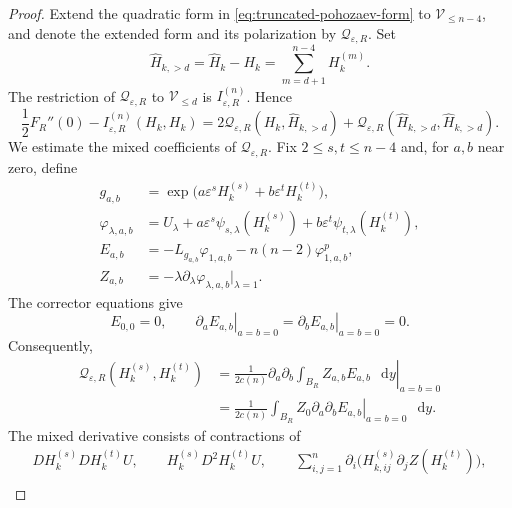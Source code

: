\documentclass[11pt]{article}
\numberwithin{equation}{section}
\theoremstyle{remark}
\newcommand{\dd}{\mathop{}\!\mathrm{d}}
\begin{document}
\begin{proof}
Extend the quadratic form in
\eqref{eq:truncated-pohozaev-form} to $\mathcal V_{\le n-4}$, and denote
the extended form and its polarization by
$\mathcal Q_{\varepsilon,R}$.
Set
{
\begin{equation*}
 \widehat H_{k,>d}
 =\widehat H_k-H_k
 =\sum_{m=d+1}^{n-4}H_k^{(m)}.
\end{equation*}
}
The restriction of $\mathcal Q_{\varepsilon,R}$ to
$\mathcal V_{\le d}$ is $I_{\varepsilon,R}^{(n)}$.  Hence
 {
\begin{equation*}
 \frac12F_R''(0)-I_{\varepsilon,R}^{(n)}(H_k,H_k)
 =2\mathcal Q_{\varepsilon,R}(H_k,\widehat H_{k,>d})
  +\mathcal Q_{\varepsilon,R}
  (\widehat H_{k,>d},\widehat H_{k,>d}).
\end{equation*}
}
We estimate the mixed coefficients of $\mathcal Q_{\varepsilon,R}$.
Fix $2\le s,t\le n-4$ and, for $a,b$ near zero, define
{
\begin{equation*}
 \begin{aligned}
 g_{a,b}
 &=\exp\bigl(a\varepsilon^sH_k^{(s)}
             +b\varepsilon^tH_k^{(t)}\bigr),\\
 \varphi_{\lambda,a,b}
 &=U_\lambda
   +a\varepsilon^s\psi_{s,\lambda}(H_k^{(s)})
   +b\varepsilon^t\psi_{t,\lambda}(H_k^{(t)}),\\
 E_{a,b}
 &=-L_{g_{a,b}}\varphi_{1,a,b}
   -n(n-2)\varphi_{1,a,b}^{p},\\
 Z_{a,b}
 &=-\lambda\partial_\lambda\varphi_{\lambda,a,b}
      \big|_{\lambda=1}.
 \end{aligned}
\end{equation*}
}
The corrector equations give
\[
 E_{0,0}=0,\qquad
 \left.\partial_aE_{a,b}\right|_{a=b=0}
 =\left.\partial_bE_{a,b}\right|_{a=b=0}=0.
\]
Consequently,
{
\begin{equation*}
 \begin{aligned}
 \mathcal Q_{\varepsilon,R}(H_k^{(s)},H_k^{(t)})
 &=\frac1{2c(n)}
   \left.\partial_a\partial_b
   \int_{B_R}Z_{a,b}E_{a,b}\,\dd y\right|_{a=b=0}\\
 &=\frac1{2c(n)}\int_{B_R}Z_0
   \left.\partial_a\partial_bE_{a,b}\right|_{a=b=0}\,\dd y.
 \end{aligned}
\end{equation*}
}
The mixed derivative consists of contractions of
\begin{equation*}
\begin{gathered}
 DH_k^{(s)}DH_k^{(t)}U,\qquad
 H_k^{(s)}D^2H_k^{(t)}U,\qquad
 \sum_{i,j=1}^n\partial_i
 \bigl(H_{k,ij}^{(s)}\partial_j Z(H_k^{(t)})\bigr),\\

\end{gathered}
\end{equation*}
\end{proof}
\end{document}
